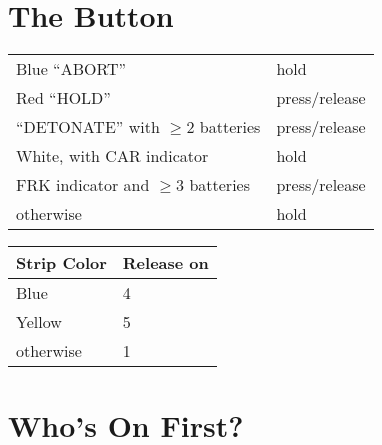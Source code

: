 \documentclass[11pt]{amsart}
\begin{document}
\section{The Button}

\begin{tabular}{|l|l|}
\hline
Blue ``ABORT''                      & hold          \\
Red ``HOLD''                        & press/release \\
``DETONATE'' with $\ge 2$ batteries & press/release \\
White, with CAR indicator           & hold          \\
FRK indicator and $\ge 3$ batteries & press/release \\
otherwise                           & hold          \\
\hline
\end{tabular}

\begin{tabular}{|l|l|}
\hline
Strip Color & Release on \\
\hline
Blue        & 4 \\
Yellow      & 5 \\
otherwise   & 1 \\
\hline
\end{tabular}



\section{Who's On First?}
\end{document}
